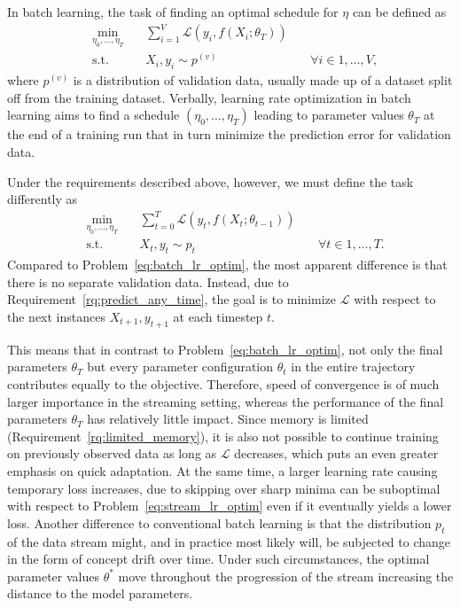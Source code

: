\documentclass[letterpaper]{article} %
\begin{document}
In batch learning, the task of finding an optimal schedule for $\eta$ can be defined as
\begin{equation}
	\label{eq:batch_lr_optim}
	\begin{alignedat}{3}
		& \!\min_{\eta_0, \ldots, \eta_T} & \, & \sum_{i=1}^{V}\mathcal{L}(y_i, f(X_i; \theta_T)) &    &                              \\
		& \text{s.t.}                     &    & X_i, y_i  \sim p^{(v)}                           & \  & \forall i \in {1, \ldots, V}
		,
	\end{alignedat}
\end{equation}
where $p^{(v)}$ is a distribution of validation data, usually made up of a dataset split off from the training dataset.
Verbally, learning rate optimization in batch learning aims to find a schedule $(\eta_0, \ldots, \eta_T)$ leading to parameter values $\theta_T$ at the end of a training run that in turn minimize the prediction error for validation data.

Under the requirements described above, however, we must define the task differently as
\begin{equation}
	\label{eq:stream_lr_optim}
	\begin{alignedat}{3}
		& \!\min_{\eta_0, \ldots, \eta_T} & \, & \sum_{t=0}^{T}\mathcal{L}(y_t, f(X_t; \theta_{t-1})) &    &                               \\
		& \text{s.t.}                     &    & X_t, y_t  \sim p_t                           & \  & \forall t \in {1, \ldots, T}.
	\end{alignedat}
\end{equation}
Compared to Problem~\eqref{eq:batch_lr_optim}, the most apparent difference is that there is no separate validation data.
Instead, due to Requirement~\ref{rq:predict_any_time}, the goal is to minimize $\mathcal{L}$ with respect to the next instances $X_{t+1}, y_{t+1}$ at each timestep $t$.

This means that in contrast to Problem~\eqref{eq:batch_lr_optim}, not only the final parameters $\theta_T$ but every parameter configuration $\theta_t$ in the entire trajectory contributes equally to the objective.
Therefore, speed of convergence is of much larger importance in the streaming setting, whereas the performance of the final parameters $\theta_T$ has relatively little impact.
Since memory is limited (Requirement~\ref{rq:limited_memory}), it is also not possible to continue training on previously observed data as long as $\mathcal{L}$ decreases, which puts an even greater emphasis on quick adaptation.
At the same time, a larger learning rate causing temporary loss increases, due to skipping over sharp minima can be suboptimal with respect to Problem~\ref{eq:stream_lr_optim} even if it eventually yields a lower loss.
Another difference to conventional batch learning is that the distribution $p_t$ of the data stream might, and in practice most likely will, be subjected to change in the form of concept drift over time.
Under such circumstances, the optimal parameter values $\theta^*$ move throughout the progression of the stream increasing the distance to the model parameters.
\end{document}
